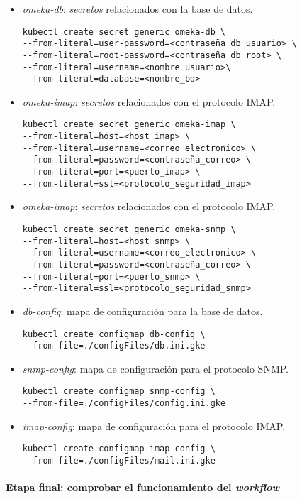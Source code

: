 \begin{itemize}
\tightlist
\item
  \emph{omeka-db}: \emph{secretos} relacionados con la base de datos.
  \begin{verbatim}
kubectl create secret generic omeka-db \
--from-literal=user-password=<contraseña_db_usuario> \
--from-literal=root-password=<contraseña_db_root> \
--from-literal=username=<nombre_usuario>\
--from-literal=database=<nombre_bd>
  \end{verbatim}
\item
  \emph{omeka-imap}: \emph{secretos} relacionados con el protocolo IMAP.
    \begin{verbatim}
kubectl create secret generic omeka-imap \
--from-literal=host=<host_imap> \
--from-literal=username=<correo_electronico> \
--from-literal=password=<contraseña_correo> \
--from-literal=port=<puerto_imap> \
--from-literal=ssl=<protocolo_seguridad_imap>
  \end{verbatim}
\item
  \emph{omeka-imap}: \emph{secretos} relacionados con el protocolo IMAP.
    \begin{verbatim}
kubectl create secret generic omeka-snmp \
--from-literal=host=<host_snmp> \
--from-literal=username=<correo_electronico> \
--from-literal=password=<contraseña_correo> \
--from-literal=port=<puerto_snmp> \
--from-literal=ssl=<protocolo_seguridad_snmp>
  \end{verbatim}
  \item
  \emph{db-config}: mapa de configuración para la base de datos.
    \begin{verbatim}
kubectl create configmap db-config \
--from-file=./configFiles/db.ini.gke
  \end{verbatim}
    \item
  \emph{snmp-config}: mapa de configuración para el protocolo SNMP.
    \begin{verbatim}
kubectl create configmap snmp-config \
--from-file=./configFiles/config.ini.gke
  \end{verbatim}
      \item
  \emph{imap-config}: mapa de configuración para el protocolo IMAP.
    \begin{verbatim}
kubectl create configmap imap-config \
--from-file=./configFiles/mail.ini.gke
  \end{verbatim}
\end{itemize}


\paragraph{Etapa final: comprobar el funcionamiento del \emph{workflow}}

